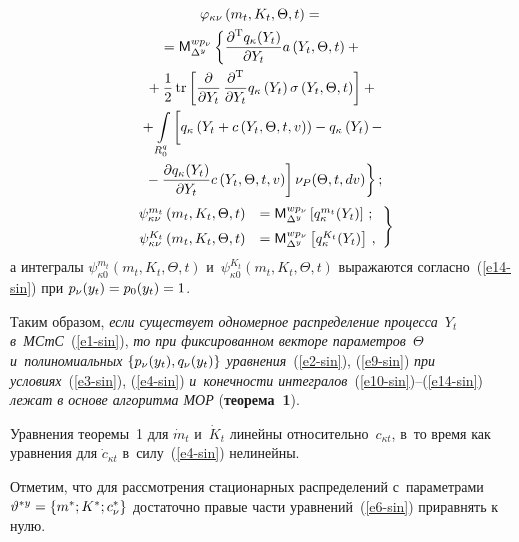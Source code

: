 \begin{multicols}{2}
    \noindent
\begin{multline}
    \vrp_{\kappa \nu}\left( m_t, K_t, \Theta, t\right) ={}\\
    {}=
    {\sf M}_{\Delta^y}^{wp_\nu} \left\{
    \fr{\prt^{\mathrm{T}} q_\kappa (Y_t)}{\prt Y_t} a \left( Y_t, \Theta, t\right) +{}\right.\\
    {}+
    \fr {1}{2}\,\mathrm{tr} \left[ \fr{\prt}{\prt Y_t} \,
    \fr{\prt^{\mathrm{T}}}{\prt Y_t} q_\kappa \left(Y_t\right) \sigma \left( Y_t, \Theta, t\right)
    \right]+{}\\
{}+ \iii_{R_0^q} \left[ \vphantom{\fr{\prt}{\prt Y_t}}
q_\kappa \left(Y_t + c\left( Y_t, \Theta, t,v\right)\right) -
q_\kappa\left( Y_t\right) - \right.\\
\left.\left.{}-\fr{\prt q_\kappa (Y_t)}{\prt Y_t} c
\left( Y_t, \Theta, t,v\right)\right] \nu_P (\Theta, t, dv)\right\};\label{e13-sin}
\end{multline}
    \begin{equation}
    \left.
    \begin{array}{rl}
    \psi_{\kappa\nu}^{m_t} \left( m_t, K_t, \Theta, t\right) &= {\sf M}_{\Delta^y}^{wp_\nu}
    \left[ q_\kappa^{m_t} (Y_t)\right]\,;\\[6pt]
    \psi_{\kappa\nu}^{K_t} \left( m_t, K_t, \Theta, t\right)&=
    {\sf M}_{\Delta^y}^{wp_\nu} \left[ q_\kappa^{K_t} (Y_t)\right]\,,
    \end{array}
    \right\}
    \label{e14-sin}
    \end{equation}
а интегралы $\psi_{\kappa 0}^{m_t} ( m_t, K_t, \Theta, t)$
и~$\psi_{\kappa 0}^{K_t} ( m_t, K_t, \Theta, t)$ выража\-ются согласно~(\ref{e14-sin})
при $p_\nu (y_t) \hm= p_0 (y_t) =1$.

Таким образом, \textit{если существует одномерное распределение процесса~$Y_t$
в~МСтС}~(\ref{e1-sin}), \textit{то при фиксированном векторе параметров~$\Theta$
и~полиномиальных  $\left\{ p_\nu (y_t), q_\nu (y_t)\right\}$ уравнения}~(\ref{e2-sin}),
(\ref{e9-sin}) \textit{при условиях}~(\ref{e3-sin}), (\ref{e4-sin})
\textit{и~конечности интегралов}~(\ref{e10-sin})--(\ref{e14-sin})
\textit{лежат в основе алгоритма МОР} (\textbf{теорема~1}).

\smallskip

Уравнения теоремы~1 для $\dot m_t$ и~$\dot K_t$ линейны относительно~$c_{\kappa t}$,
 в~то время как уравнения для $\dot c_{\kappa t}$  в~силу~(\ref{e4-sin}) нелинейны.

Отметим, что для рассмотрения стационарных распределений
с~параметрами $\vartheta^{*y} \hm= \lf m^*; K^*; c_\nu^*\rf$ достаточно
правые части уравнений~(\ref{e6-sin}) приравнять к нулю.



\end{multicols}
